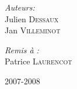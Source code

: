 \begin{titlepage}
		\vfill
		\begin{minipage}{0.5\textwidth}
			\begin{flushleft} \large
				\emph{Auteurs:}\\
				 Julien \textsc{Dessaux}\\
				 Jan \textsc{Villeminot}

			\end{flushleft}
		\end{minipage}
		\begin{minipage}{0.45\textwidth}
			\begin{flushright} \large
				\emph{Remis à :} \\
				Patrice \textsc{Laurencot}\\
			\end{flushright}
		\end{minipage}
		
		\vfil
		\begin{center}
			{\large 2007-2008}
		\end{center}
	\end{titlepage}
